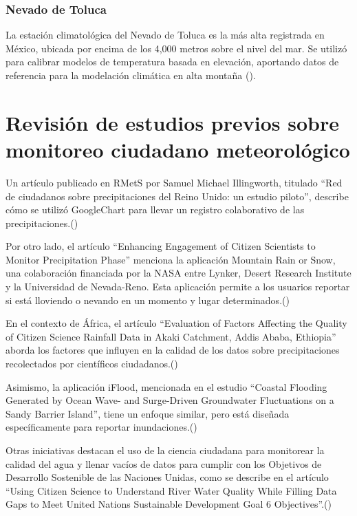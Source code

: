 \subsubsection{Nevado de Toluca}

La estación climatológica del Nevado de Toluca es la más alta registrada en México, ubicada por encima de los 4,000 metros sobre el nivel del mar. Se utilizó para calibrar modelos de temperatura basada en elevación, aportando datos de referencia para la modelación climática en alta montaña  (\cite{soto_delgado_2020}).




\section{Revisión de estudios previos sobre monitoreo ciudadano meteorológico}

Un artículo publicado en RMetS por Samuel Michael Illingworth, titulado ``Red de ciudadanos sobre precipitaciones del Reino Unido: un estudio piloto'', describe cómo se utilizó GoogleChart para llevar un registro colaborativo de las precipitaciones.(\cite{illingworth2021ukprecipitation}) 

Por otro lado, el artículo ``Enhancing Engagement of Citizen Scientists to Monitor Precipitation Phase'' menciona la aplicación Mountain Rain or Snow, una colaboración financiada por la NASA entre Lynker, Desert Research Institute y la Universidad de Nevada-Reno. Esta aplicación permite a los usuarios reportar si está lloviendo o nevando en un momento y lugar determinados.(\cite{lute2021enhancing})


En el contexto de África, el artículo ``Evaluation of Factors Affecting the Quality of Citizen Science Rainfall Data in Akaki Catchment, Addis Ababa, Ethiopia'' aborda los factores que influyen en la calidad de los datos sobre precipitaciones recolectados por científicos ciudadanos.(\cite{tedla2022evaluation}) 

Asimismo, la aplicación iFlood, mencionada en el estudio ``Coastal Flooding Generated by Ocean Wave- and Surge-Driven Groundwater Fluctuations on a Sandy Barrier Island'', tiene un enfoque similar, pero está diseñada específicamente para reportar inundaciones.(\cite{elgar2021coastal}) 


Otras iniciativas destacan el uso de la ciencia ciudadana para monitorear la calidad del agua y llenar vacíos de datos para cumplir con los Objetivos de Desarrollo Sostenible de las Naciones Unidas, como se describe en el artículo ``Using Citizen Science to Understand River Water Quality While Filling Data Gaps to Meet United Nations Sustainable Development Goal 6 Objectives''.(\cite{mcginn2021using})

